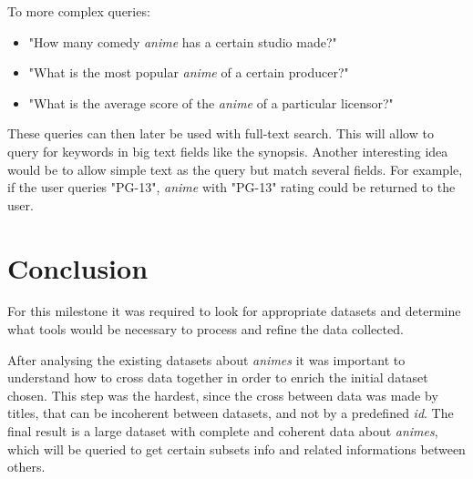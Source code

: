 \documentclass[twocolumn,twoside,11pt,a4paper]{article}
\begin{document}
To more complex queries:
\begin{itemize}
\item "How many comedy \textit{anime} has a certain studio made?"
\item "What is the most popular \textit{anime} of a certain producer?"
\item "What is the average score of the \textit{anime} of a particular licensor?"
\end{itemize}
These queries can then later be used with full-text search. This will allow to query for keywords in big text fields like the synopsis. Another interesting idea would be to allow simple text as the query but match several fields. For example, if the user queries "PG-13", \textit{anime} with "PG-13" rating could be returned to the user.


\section{Conclusion}\label{conclusion}
For this milestone it was required to look for appropriate datasets and determine what tools would be necessary to process and refine the data collected.
\par
After analysing the existing datasets about \textit{animes} it was important to understand how to cross data together in order to enrich the initial dataset chosen. This step was the hardest, since the cross between data was made by titles, that can be incoherent between datasets, and not by a predefined \textit{id}.  The final result is a large dataset with complete and coherent data about \textit{animes}, which will be queried to get certain subsets info and related informations between others.
\end{document}
